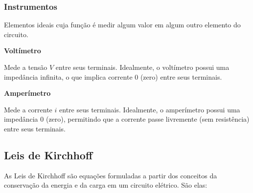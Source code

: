 \documentclass{article}
\numberwithin{equation}{section}
\newlength\Colsep
\begin{document}
    \subsubsection{Instrumentos}
    \label{subsubsec:instrumentos}
    Elementos ideais cuja função é medir algum valor em algum outro elemento do circuito.

    \noindent\begin{minipage}{\textwidth}
        \begin{minipage}[t][4cm]{\dimexpr0.5\textwidth-\Colsep\relax}
            \begin{center}{\textbf{Voltímetro}}\end{center}
            Mede a tensão $V$ entre seus terminais. Idealmente, o voltímetro possui uma impedância infinita, o que implica corrente $0$ (zero) entre seus terminais.
        \end{minipage}
        \begin{minipage}[t][4cm]{\dimexpr0.5\textwidth\relax}
            \begin{center}{\textbf{Amperímetro}}\end{center}
            Mede a corrente $i$ entre seus terminais. Idealmente, o amperímetro possui uma impedância $0$ (zero), permitindo que a corrente passe livremente (sem resistência) entre seus terminais.
        \end{minipage} \hfill
    \end{minipage}

    \subsection{Leis de Kirchhoff}
    \label{subsec:Kirchhoff}

    As Leis de Kirchhoff são equações formuladas a partir dos conceitos da conservação da energia e da carga em um circuito elétrico. São elas:
\end{document}
